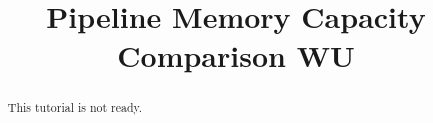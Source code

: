 \documentclass[justified]{tufte-handout}
\title{Pipeline Memory Capacity Comparison WU}
\begin{document}
\maketitle

\begin{abstract}
\noindent
This tutorial is not ready. 
\end{abstract}
\end{document}
